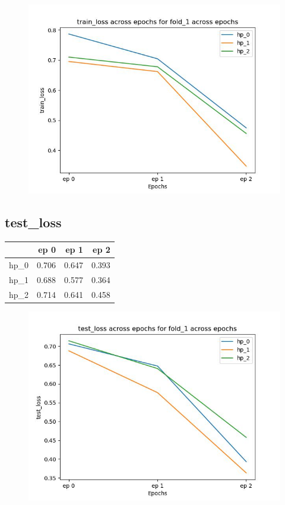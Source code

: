 \documentclass{article}
\begin{document}
\begin{figure}[H]
\includegraphics[scale = 0.75]{fold_1/train_loss}
\end{figure}
\subsection{test\_loss}
\begin{tabular}{lrrr}
\toprule
{} &   ep 0 &   ep 1 &   ep 2 \\
\midrule
hp\_0 &  0.706 &  0.647 &  0.393 \\
hp\_1 &  0.688 &  0.577 &  0.364 \\
hp\_2 &  0.714 &  0.641 &  0.458 \\
\bottomrule
\end{tabular}

\begin{figure}[H]
\includegraphics[scale = 0.75]{fold_1/test_loss}
\end{figure}
\end{document}
